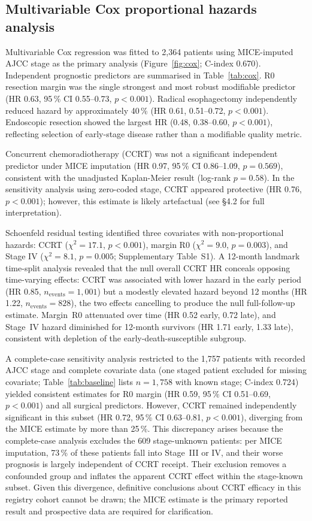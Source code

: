 \documentclass[12pt,a4paper]{article}
\begin{document}
\subsection{Multivariable Cox proportional hazards analysis}
Multivariable Cox regression was fitted to 2,364 patients using
MICE-imputed AJCC stage as the primary analysis
(Figure~\ref{fig:cox}; C-index 0.670).
Independent prognostic predictors are summarised in
Table~\ref{tab:cox}. R0 resection margin was the single strongest
and most robust modifiable predictor (HR 0.63, 95\,\% CI 0.55--0.73,
$p < 0.001$). Radical esophagectomy independently reduced hazard by
approximately 40\,\% (HR 0.61, 0.51--0.72, $p < 0.001$). Endoscopic
resection showed the largest HR (0.48, 0.38--0.60, $p < 0.001$),
reflecting selection of early-stage disease rather than a modifiable
quality metric.

Concurrent chemoradiotherapy (CCRT) was not a significant independent
predictor under MICE imputation (HR 0.97, 95\,\% CI 0.86--1.09,
$p = 0.569$), consistent with the unadjusted Kaplan-Meier result
(log-rank $p = 0.58$). In the sensitivity analysis using zero-coded
stage, CCRT appeared protective (HR 0.76, $p < 0.001$); however, this
estimate is likely artefactual (see §4.2 for full interpretation).

Schoenfeld residual testing identified three covariates with
non-proportional hazards: CCRT ($\chi^2 = 17.1$, $p < 0.001$),
margin R0 ($\chi^2 = 9.0$, $p = 0.003$), and Stage IV
($\chi^2 = 8.1$, $p = 0.005$; Supplementary Table~S1).
A 12-month landmark time-split analysis revealed that the null
overall CCRT HR conceals opposing time-varying effects:
CCRT was associated with lower hazard in the early period
(HR 0.85, $n_{\text{events}} = 1{,}001$) but a modestly elevated
hazard beyond 12 months (HR 1.22, $n_{\text{events}} = 828$),
the two effects cancelling to produce the null full-follow-up estimate.
Margin~R0 attenuated over time (HR 0.52 early, 0.72 late), and
Stage~IV hazard diminished for 12-month survivors (HR 1.71 early,
1.33 late), consistent with depletion of the early-death-susceptible
subgroup.

A complete-case sensitivity analysis restricted to the 1,757 patients
with recorded AJCC stage and complete covariate data (one staged patient
excluded for missing covariate; Table~\ref{tab:baseline} lists $n = 1{,}758$
with known stage; C-index 0.724) yielded consistent estimates
for R0 margin (HR 0.59, 95\,\% CI 0.51--0.69, $p < 0.001$) and all
surgical predictors. However, CCRT remained independently significant
in this subset (HR 0.72, 95\,\% CI 0.63--0.81, $p < 0.001$),
diverging from the MICE estimate by more than 25\,\%. This discrepancy
arises because the complete-case analysis excludes the 609 stage-unknown
patients: per MICE imputation, 73\,\% of these patients fall into
Stage~III or IV, and their worse prognosis is largely independent of
CCRT receipt. Their exclusion removes a confounded group and inflates
the apparent CCRT effect within the stage-known subset. Given this
divergence, definitive conclusions about CCRT efficacy in this registry
cohort cannot be drawn; the MICE estimate is the primary reported result
and prospective data are required for clarification.
\end{document}
